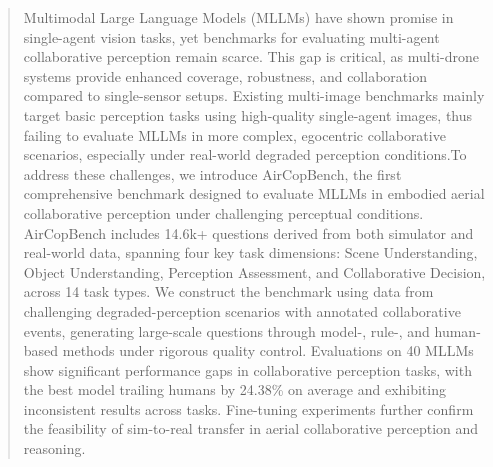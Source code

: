 \documentclass[letterpaper]{article} %
\begin{document}
\begin{abstract}
Multimodal Large Language Models (MLLMs) have shown promise in single-agent vision tasks, yet benchmarks for evaluating multi-agent collaborative perception remain scarce. This gap is critical, as multi-drone systems provide enhanced coverage, robustness, and collaboration compared to single-sensor setups. Existing multi-image benchmarks mainly target basic perception tasks using high-quality single-agent images, thus failing to evaluate MLLMs in more complex, egocentric collaborative scenarios, especially under real-world degraded perception conditions.To address these challenges, we introduce AirCopBench, the first comprehensive benchmark designed to evaluate MLLMs in embodied aerial collaborative perception under challenging perceptual conditions. AirCopBench includes 14.6k+ questions derived from both simulator and real-world data, spanning four key task dimensions: Scene Understanding, Object Understanding, Perception Assessment, and Collaborative Decision, across 14 task types. 
We construct the benchmark using data from challenging degraded-perception scenarios with annotated collaborative events, generating large-scale questions through model-, rule-, and human-based methods under rigorous quality control. Evaluations on 40 MLLMs show significant performance gaps in collaborative perception tasks, with the best model trailing humans by 24.38\% on average and exhibiting inconsistent results across tasks. Fine-tuning experiments further confirm the feasibility of sim-to-real transfer in aerial collaborative perception and reasoning.
\end{abstract}

\begin{links}
\vspace{-0.3cm}
    \vspace{-0.3cm}
\end{links}
\end{document}
